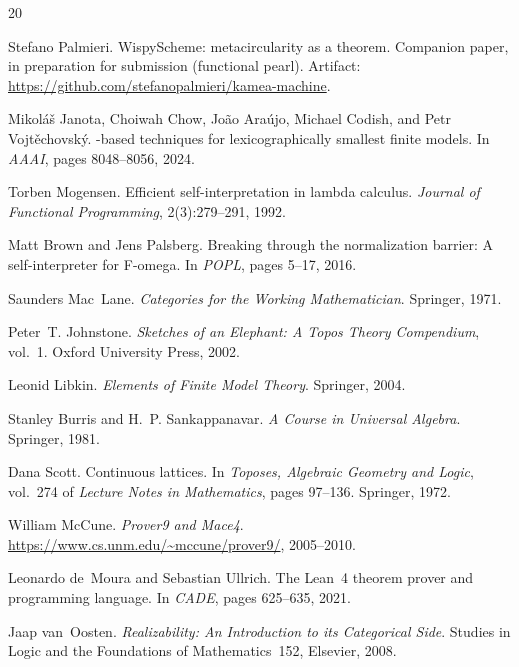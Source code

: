 \documentclass[sigconf,screen]{acmart}
\theoremstyle{remark}
\begin{document}
\begin{thebibliography}{20}

Stefano Palmieri.
\newblock WispyScheme: metacircularity as a theorem.
\newblock Companion paper, in preparation for submission (functional
pearl). Artifact: \url{https://github.com/stefanopalmieri/kamea-machine}.

Mikol\'a\v{s} Janota, Choiwah Chow, Jo\~ao Ara\'ujo, Michael Codish, and Petr Vojt\v{e}chovsk\'y.
-based techniques for lexicographically smallest finite models.
\newblock In \emph{AAAI}, pages 8048--8056, 2024.

Torben Mogensen.
\newblock Efficient self-interpretation in lambda calculus.
\newblock \emph{Journal of Functional Programming}, 2(3):279--291, 1992.

Matt Brown and Jens Palsberg.
\newblock Breaking through the normalization barrier: A self-interpreter for {F-omega}.
\newblock In \emph{POPL}, pages 5--17, 2016.

Saunders Mac~Lane.
\newblock \emph{Categories for the Working Mathematician}.
\newblock Springer, 1971.

Peter~T. Johnstone.
\newblock \emph{Sketches of an Elephant: A Topos Theory Compendium}, vol.~1.
\newblock Oxford University Press, 2002.

Leonid Libkin.
\newblock \emph{Elements of Finite Model Theory}.
\newblock Springer, 2004.

Stanley Burris and H.~P. Sankappanavar.
\newblock \emph{A Course in Universal Algebra}.
\newblock Springer, 1981.

Dana Scott.
\newblock Continuous lattices.
\newblock In \emph{Toposes, Algebraic Geometry and Logic}, vol.~274 of \emph{Lecture Notes in Mathematics}, pages 97--136. Springer, 1972.

William McCune.
\newblock \emph{Prover9 and Mace4}.
\newblock \url{https://www.cs.unm.edu/~mccune/prover9/}, 2005--2010.

Leonardo de~Moura and Sebastian Ullrich.
\newblock The {Lean}~4 theorem prover and programming language.
\newblock In \emph{CADE}, pages 625--635, 2021.

Jaap van~Oosten.
\newblock \emph{Realizability: An Introduction to its Categorical Side}.
\newblock Studies in Logic and the Foundations of Mathematics~152, Elsevier, 2008.


\end{thebibliography}
\end{document}
